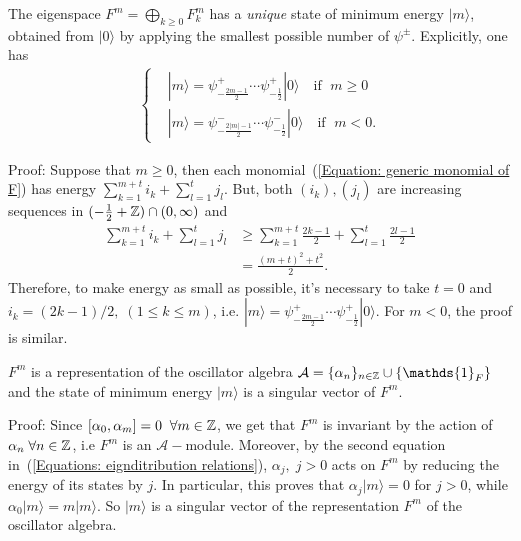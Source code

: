 \begin{dang}
    \begin{lemma}\cite{kac2013bombay}\label{Lemma: Fm has unique state of minimum energy}
        The eigenspace $F^m=\bigoplus_{k\geq0}F_k^m$ has a \textit{unique} state of minimum energy $|m\rangle$, obtained from $|0\rangle$ by applying the smallest possible number of $\psi^{\pm}$. Explicitly, one has
\begin{equation}
\begin{split}
    \left\{\begin{matrix}
        &|m\rangle =\psi^+_{-\frac{2m-1}{2}}\cdots\psi^+_{-\frac{1}{2}}|0\rangle\quad\text{if }\;m\geq0\\
        &|m\rangle =\psi^-_{-\frac{2|m|-1}{2}}\cdots\psi^-_{-\frac{1}{2}}|0\rangle\quad\text{if }\;m<0.
    \end{matrix}\right.
\end{split}
\end{equation}
    \end{lemma}
\end{dang}
Proof: Suppose that $m\geq 0$, then each monomial~(\ref{Equation: generic monomial of F})
 has energy $\sum_{k=1}^{m+t}i_k+\sum_{l=1}^tj_l$. But, both $(i_k), (j_l)$ are increasing sequences in $(-\frac{1}{2}+\mathbb{Z})\cap(0,\infty)$ and
 \begin{equation}
 \begin{split}
     \sum_{k=1}^{m+t}i_k+\sum_{l=1}^tj_l&\geq \sum_{k=1}^{m+t}\frac{2k-1}{2}+\sum_{l=1}^t\frac{2l-1}{2}\\
     &=\frac{(m+t)^2+t^2}{2}.
 \end{split}
 \end{equation}
 Therefore, to make energy as small as possible, it's necessary to take $t=0$ and $i_k=(2k-1)/2,\;(1\leq k\leq m)$, i.e. $|m\rangle =\psi^+_{-\frac{2m-1}{2}}\cdots\psi^+_{-\frac{1}{2}}|0\rangle$. For $m<0$, the proof is similar.
\begin{dang}
    \begin{lemma}\cite{kac2013bombay}\label{Lemma: Fm is a representation of the osillator algebra}
        $F^m$ is a representation of the oscillator algebra $\mathcal{A}=\{\alpha_n\}_{n\in\bb{Z}}\cup\{\mathds{1}_F\}$ and the state of minimum energy $|m\rangle$ is a singular vector of $F^m$.
    \end{lemma}
\end{dang}
Proof: Since $[\alpha_0,\alpha_m]=0\;\;\forall m\in\mathbb{Z}$, we get that $F^m$ is invariant by the action of $\alpha_n\;\forall n\in\mathbb{Z}$, i.e $F^m$ is an $\mathcal{A}-$module. Moreover, by the second equation in~(\ref{Equations: eignditribution relations}), $\alpha_j,\;j>0$ acts on $F^m$ by reducing the energy of its states by $j$. In particular, this proves that $\alpha_j|m\rangle=0$ for $j>0$, while $\alpha_0|m\rangle = m|m\rangle$. So $|m\rangle$ is a singular vector of the representation $F^m$ of the oscillator algebra.
